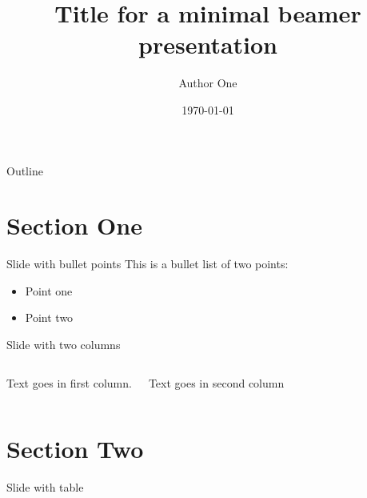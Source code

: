 \documentclass[aspectratio=169, 12pt]{beamer} %
\title{Title for a minimal beamer presentation} %
\author{Author One}               %
\institute{Name of department/affiliation}         %
\date{\today}                 %
\begin{document}

\maketitle

  

\begin{frame}{Outline}
  \tableofcontents
\end{frame}

%

\section{Section One}

\begin{frame}{Slide with bullet points}
  This is a bullet list of two points:
    \begin{itemize}
    \item Point one
        \item Point two
  \end{itemize}
\end{frame}

\begin{frame}{Slide with two columns}
  \begin{columns}
        Text goes in first column.
        
        Text goes in second column
  \end{columns}
\end{frame}

\section{Section Two}

\begin{frame}{Slide with table}
  
\end{frame}
\end{document}
